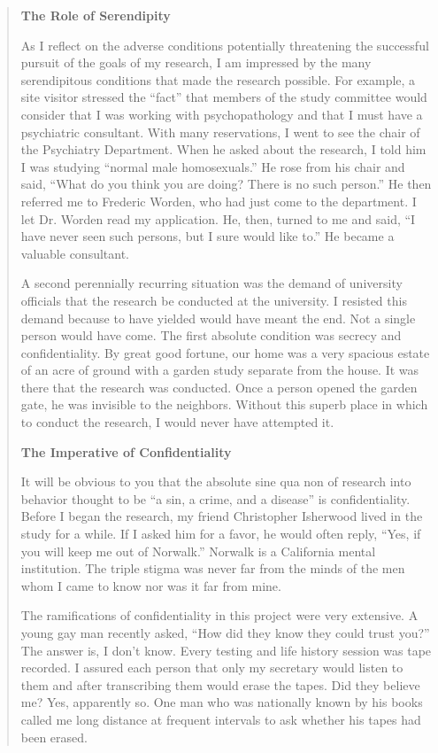 \begin{refsection}
\begin{quote}
\textbf{The Role of Serendipity} 

As I reflect on the adverse conditions potentially threatening the successful pursuit of the goals of my research, I am impressed by the many serendipitous conditions that made the research possible. For example, a site visitor stressed the ``fact'' that members of the study committee would consider that I was working with psychopathology and that I must have a psychiatric consultant. With many reservations, I went to see the chair of the Psychiatry Department. When he asked about the research, I told him I was studying ``normal male homosexuals.'' He rose from his chair and said, ``What do you think you are doing? There is no such person.'' He then referred me to Frederic Worden, who had just come to the department. I let Dr. Worden read my application. He, then, turned to me and said, ``I have never seen such persons, but I sure would like to.'' He became a valuable consultant.

A second perennially recurring situation was the demand of university officials that the research be conducted at the university. I resisted this demand because to have yielded would have meant the end. Not a single person would have come. The first absolute condition was secrecy and confidentiality. By great good fortune, our home was a very spacious estate of an acre of ground with a garden study separate from the house. It was there that the research was conducted. Once a person opened the garden gate, he was invisible to the neighbors. Without this superb place in which to conduct the research, I would never have attempted it.

\textbf{The Imperative of Confidentiality}

It will be obvious to you that the absolute sine qua non of research into behavior thought to be ``a sin, a crime, and a disease'' is confidentiality. Before I began the research, my friend Christopher Isherwood lived in the study for a while. If I asked him for a favor, he would often reply, ``Yes, if you will keep me out of Norwalk.'' Norwalk is a California mental institution. The triple stigma was never far from the minds of the men whom I came to know nor was it far from mine.

The ramifications of confidentiality in this project were very extensive. A young gay man recently asked, ``How did they know they could trust you?'' The answer is, I don't know. Every testing and life history session was tape recorded. I assured each person that only my secretary would listen to them and after transcribing them would erase the tapes. Did they believe me? Yes, apparently so. One man who was nationally known by his books called me long distance at frequent intervals to ask whether his tapes had been erased.


\end{quote}
\end{refsection}
